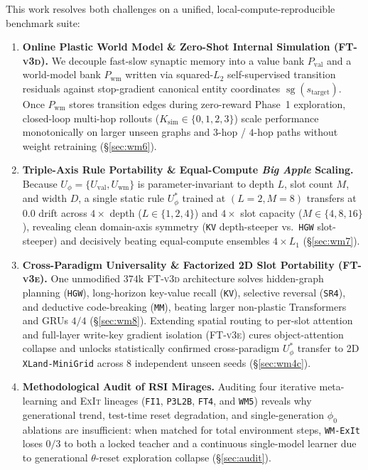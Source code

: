 \documentclass[11pt]{article}
\newcommand{\sg}{\operatorname{sg}}
\newcommand{\Uphi}{U_\phi}
\newcommand{\Uval}{U_{\mathrm{val}}}
\newcommand{\Uwm}{U_{\mathrm{wm}}}
\newcommand{\Pval}{P_{\mathrm{val}}}
\newcommand{\Pwm}{P_{\mathrm{wm}}}
\newcommand{\Ksim}{K_{\mathrm{sim}}}
\newcommand{\ftd}{\textsc{FT-v3d}}
\newcommand{\fte}{\textsc{FT-v3e}}
\begin{document}
This work resolves both challenges on a unified, local-compute-reproducible benchmark suite:
\begin{enumerate}
  \item \textbf{Online Plastic World Model \& Zero-Shot Internal Simulation (\ftd{}).} We decouple fast-slow synaptic memory into a value bank $\Pval$ and a world-model bank $\Pwm$ written via squared-$L_2$ self-supervised transition residuals against stop-gradient canonical entity coordinates $\sg(s_{\text{target}})$. Once $\Pwm$ stores transition edges during zero-reward Phase~1 exploration, closed-loop multi-hop rollouts ($\Ksim \in \{0,1,2,3\}$) scale performance monotonically on larger unseen graphs and $3$-hop / $4$-hop paths without weight retraining (\S\ref{sec:wm6}).
  \item \textbf{Triple-Axis Rule Portability \& Equal-Compute \emph{Big Apple} Scaling.} Because $\Uphi = \{\Uval, \Uwm\}$ is parameter-invariant to depth $L$, slot count $M$, and width $D$, a single static rule $\Uphi^*$ trained at $(L{=}2, M{=}8)$ transfers at $0.0$ drift across $4\times$ depth ($L \in \{1,2,4\}$) and $4\times$ slot capacity ($M \in \{4,8,16\}$), revealing clean domain-axis symmetry (\texttt{KV} depth-steeper vs.\ \texttt{HGW} slot-steeper) and decisively beating equal-compute ensembles $4\times L_1$ (\S\ref{sec:wm7}).
  \item \textbf{Cross-Paradigm Universality \& Factorized 2D Slot Portability (\fte{}).} One unmodified $374\text{k}$ \ftd{} architecture solves hidden-graph planning (\texttt{HGW}), long-horizon key-value recall (\texttt{KV}), selective reversal (\texttt{SR4}), and deductive code-breaking (\texttt{MM}), beating larger non-plastic Transformers and GRUs $4/4$ (\S\ref{sec:wm8}). Extending spatial routing to per-slot attention and full-layer write-key gradient isolation (\fte{}) cures object-attention collapse and unlocks statistically confirmed cross-paradigm $\Uphi^*$ transfer to 2D \texttt{XLand-MiniGrid} \citep{nikulin2024xland} across $8$ independent unseen seeds (\S\ref{sec:wm4c}).
  \item \textbf{Methodological Audit of RSI Mirages.} Auditing four iterative meta-learning and \textsc{ExIt} lineages (\texttt{FI1}, \texttt{P3L2B}, \texttt{FT4}, and \texttt{WM5}) reveals why generational trend, test-time reset degradation, and single-generation $\phi_0$ ablations are insufficient: when matched for total environment steps, \texttt{WM-ExIt} loses $0/3$ to both a locked teacher and a continuous single-model learner due to generational $\theta$-reset exploration collapse (\S\ref{sec:audit}).
\end{enumerate}
\end{document}
